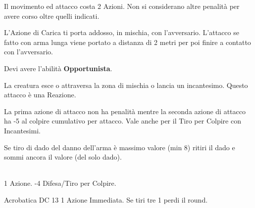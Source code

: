 \documentclass[landscape,10pt,a4paper]{article}
\begin{document}
\begin{multicols}{3}
\begin{dmbox}[title=Carica - pagina \pageref{carica}]
Il movimento ed attacco costa 2 Azioni. Non si considerano altre penalità per avere corso oltre quelli indicati.

L'Azione di Carica ti porta addosso, in mischia, con l'avversario. L'attacco se fatto con arma lunga viene portato a distanza di 2 metri per poi finire a contatto con l'avversario.
\end{dmbox}

\begin{dmbox}[title=Attacco di Opportunita' - pagina \pageref{attaccoopportunita}]
Devi avere l'abilità \textbf{Opportunista}.

La creatura esce o attraversa la zona di mischia o lancia un incantesimo. Questo attacco è una Reazione.
\end{dmbox}

\begin{dmbox}[title=Attacchi Multipli - pagina \pageref{attacchimultiplimischia}]
La prima azione di attacco non ha penalità mentre la seconda azione di attacco ha -5 al colpire cumulativo per attacco. Vale anche per il Tiro per Colpire con Incantesimi.
\end{dmbox}

\begin{dmbox}[title=Esplosione del Danno - pagina \pageref{esplosionedeldanno}]
Se tiro di dado del danno dell'arma è massimo valore (min 8) ritiri il dado e sommi ancora il valore (del solo dado).
\end{dmbox}

\begin{dmbox}[title=Alzarsi da prono - pagina \pageref{alzarsidaprono}]
\textbf{}\\
1 Azione. -4 Difesa/Tiro per Colpire.

Acrobatica DC 13 1 Azione Immediata. Se tiri tre 1 perdi il round. 
\end{dmbox}

\begin{dmbox}[title=Azioni per Round - pagina \pageref{azioninelround}]


\end{dmbox}
\end{multicols}
\end{document}
